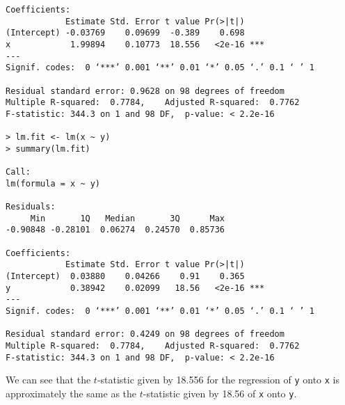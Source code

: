 \begin{itemize}
\begin{verbatim}
Coefficients:
            Estimate Std. Error t value Pr(>|t|)    
(Intercept) -0.03769    0.09699  -0.389    0.698    
x            1.99894    0.10773  18.556   <2e-16 ***
---
Signif. codes:  0 ‘***’ 0.001 ‘**’ 0.01 ‘*’ 0.05 ‘.’ 0.1 ‘ ’ 1

Residual standard error: 0.9628 on 98 degrees of freedom
Multiple R-squared:  0.7784,    Adjusted R-squared:  0.7762 
F-statistic: 344.3 on 1 and 98 DF,  p-value: < 2.2e-16

> lm.fit <- lm(x ~ y)
> summary(lm.fit)

Call:
lm(formula = x ~ y)

Residuals:
     Min       1Q   Median       3Q      Max 
-0.90848 -0.28101  0.06274  0.24570  0.85736 

Coefficients:
            Estimate Std. Error t value Pr(>|t|)    
(Intercept)  0.03880    0.04266    0.91    0.365    
y            0.38942    0.02099   18.56   <2e-16 ***
---
Signif. codes:  0 ‘***’ 0.001 ‘**’ 0.01 ‘*’ 0.05 ‘.’ 0.1 ‘ ’ 1

Residual standard error: 0.4249 on 98 degrees of freedom
Multiple R-squared:  0.7784,    Adjusted R-squared:  0.7762 
F-statistic: 344.3 on 1 and 98 DF,  p-value: < 2.2e-16
        \end{verbatim}\normalsize
        We can see that the $t$-statistic given by 18.556 for the regression of \verb|y| 
        onto \verb|x| is approximately the same as the $t$-statistic given by 18.56 of 
        \verb|x| onto \verb|y|.
\end{itemize}
